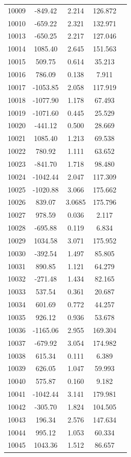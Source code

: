{\begin{longtable}{ccccc}
10009 & -849.42 & 2.214 & 126.872\\
10010 & -659.22 & 2.321 & 132.971\\
10013 & -650.25 & 2.217 & 127.046\\
10014 & 1085.40 & 2.645 & 151.563\\
10015 & 509.75 & 0.614 & 35.213\\
10016 & 786.09 & 0.138 & 7.911\\
10017 & -1053.85 & 2.058 & 117.919\\
10018 & -1077.90 & 1.178 & 67.493\\
10019 & -1071.60 & 0.445 & 25.529\\
10020 & -441.12 & 0.500 & 28.669\\
10021 & 1085.40 & 1.213 & 69.538\\
10022 & 780.92 & 1.111 & 63.652\\
10023 & -841.70 & 1.718 & 98.480\\
10024 & -1042.44 & 2.047 & 117.309\\
10025 & -1020.88 & 3.066 & 175.662\\
10026 & 839.07 & 3.0685 & 175.796\\
10027 & 978.59 & 0.036 & 2.117\\
10028 & -695.88 & 0.119 & 6.834\\
10029 & 1034.58 & 3.071 & 175.952\\
10030 & -392.54 & 1.497 & 85.805\\
10031 & 890.85 & 1.121 & 64.279\\
10032 & -271.48 & 1.434 & 82.165\\
10033 & 537.54 & 0.361 & 20.687\\
10034 & 601.69 & 0.772 & 44.257\\
10035 & 926.12 & 0.936 & 53.678\\
10036 & -1165.06 & 2.955 & 169.304\\
10037 & -679.92 & 3.054 & 174.982\\
10038 & 615.34 & 0.111 & 6.389\\
10039 & 626.05 & 1.047 & 59.993\\
10040 & 575.87 & 0.160 & 9.182\\
10041 & -1042.44 & 3.141 & 179.981\\
10042 & -305.70 & 1.824 & 104.505\\
10043 & 196.34 & 2.576 & 147.634\\
10044 & 995.12 & 1.053 & 60.334\\
10045 & 1043.36 & 1.512 & 86.657\\

\end{longtable}}
